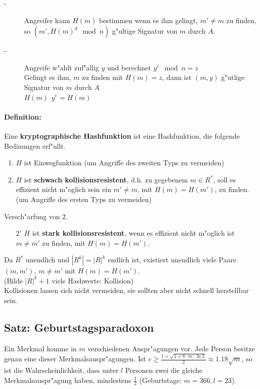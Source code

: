 \begin{description}
	\item[-] Angreifer kann $H(m)$ bestimmen wenn es ihm gelingt, $m' \neq m$ zu finden, so $(m', H(m)^d \mod{n})$ g"ultige Signatur von $m$ durch $A$.
	\item[-] Angreife w"ahlt zuf"allig $y$ und berechnet $y^e \mod{n} = z$\\
	Gelingt es ihm, $m$ zu finden mit $H(m)=z$, dann ist $(m,y)$ g"utlige Signatur von $m$ durch $A$\\
	$H(m)\ \  y^e=H(m)$ 
\end{description}

\paragraph{Definition:}

Eine \textbf{kryptographische Hashfunktion} ist eine Hashfunktion, die folgende Bedinungen erf"ullt.
\begin{enumerate}
	\item $H$ ist Einwegfunktion (um Angriffe des zweiten Typs zu vermeiden)
	\item $H$ ist \textbf{schwach kollisionsresistent}, d.h. zu gegebenem $m \in R^{*}$, soll es effizient nicht m"oglich sein ein $m' \neq m$, mit $H(m)=H(m')$, zu finden. (um Angriffe des ersten Typs zu vermeiden)
\end{enumerate}
Versch"arfung von 2.
\begin{enumerate}
	\item[$2'$] $H$ ist \textbf{stark kollisionsresistent}, wenn es effizient nicht m"oglich ist $m \neq m'$ zu finden, mit  $H(m) = H (m')$.
\end{enumerate}

Da $R^{*}$ unendlich und $\left| R^k \right|=\left|R\right|^k$ endlich ist, existiert unendlich viele Paare $(m,m'),\ m\neq m'$ mit $H(m)=H(m')$.\\
(Bilde $\left|R\right|^k+1$ viele Hashwerte: Kollision)\\
Kollisionen lassen sich nicht vermeiden, sie sollten aber nicht schnell herstellbar sein.

\subsection{Satz: Geburtstagsparadoxon}

Ein Merkmal komme in $m$ verschiedenen Auspr"agungen vor. Jede Person besitze genau eine dieser Merkmalsauspr"agungen. Ist $c \geq \frac{1+\sqrt{1+8\cdot m \cdot \ln{2}}}{2} \approx 1.18 \sqrt{m}$, so ist die Wahrscheinlichkeit, dass unter $l$ Personen zwei die gleiche Merkmalsauspr"agung haben, mindestens $\frac{1}{2}$ (Geburtstage: $m=366, l=23$).

